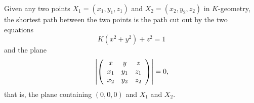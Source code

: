 \documentclass{ximera}
\begin{document}
\begin{theorem}
Given any two points $X_{1}=\left( x_{1},y_{1},z_{1}\right) $ and
$X_{2}=\left( x_{2},y_{2},z_{2}\right) $ in $K$-geometry, the shortest
path between the two points is the path cut out by the two equations%
\[
K\left(  x^{2}+y^{2}\right)  +z^{2}=1
\]
and the plane%
\begin{equation}
\left\vert \left(
\begin{array}
[c]{ccc}%
x & y & z\\
x_{1} & y_{1} & z_{1}\\
x_{2} & y_{2} & z_{2}%
\end{array}
\right)  \right\vert =0, \label{90}%
\end{equation}
that is, the plane containing $\left(  0,0,0\right)  $ and $X_{1}$ and $X_{2}$.
\end{theorem}
\end{document}
